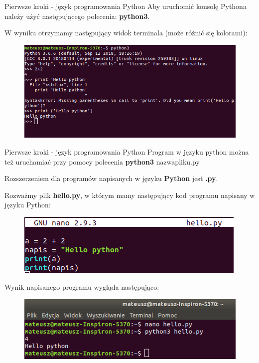 \documentclass[10pt,ignorenonframetext,]{beamer}
\begin{document}
\begin{frame}{Pierwsze kroki - język programowania Python}
  Aby uruchomić konsolę Pythona należy użyć następującego polecenia: \textbf{python3}. 
  
  W wyniku otrzymamy następujący widok terminala (może różnić się kolorami): 
  \begin{figure}[!h]
  	\centering
  	\includegraphics[scale=0.45]{pictures/python.png}
  \end{figure}
\end{frame}

\begin{frame}{Pierwsze kroki - język programowania Python}
  Program w języku python można też uruchamiać przy pomocy polecenia \textbf{python3} nazwapliku.py
  
  Rozszerzeniem dla programów napisanych w języku \textbf{Python} jest \textbf{.py}.
  
  Rozważmy plik \textbf{hello.py}, w którym mamy następujący kod programu napisany w języku Python: 
  
    \begin{figure}[!h]
  	\centering
  	\includegraphics[scale=0.35]{pictures/helloPy.png}
  \end{figure}
  Wynik napisanego programu wygląda następująco: 
    \begin{figure}[!h]
  	\centering
  	\includegraphics[scale=0.35]{pictures/outputPython.png}
  \end{figure}
\end{frame}
\end{document}
